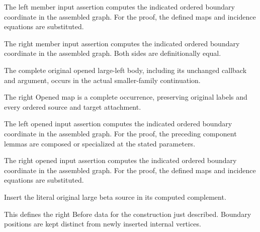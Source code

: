 The left member input assertion computes the indicated ordered boundary coordinate in the assembled graph.
For the proof, the defined maps and incidence equations are substituted.
\par{}

The right member input assertion computes the indicated ordered boundary coordinate in the assembled graph.
Both sides are definitionally equal.
\par{}

The complete original opened large-left body, including its unchanged callback and argument, occurs in the actual smaller-family continuation.
\par{}

The right Opened map is a complete occurrence, preserving original labels and every ordered source and target attachment.
\par{}

The left opened input assertion computes the indicated ordered boundary coordinate in the assembled graph.
For the proof, the preceding component lemmas are composed or specialized at the stated parameters.
\par{}

The right opened input assertion computes the indicated ordered boundary coordinate in the assembled graph.
For the proof, the defined maps and incidence equations are substituted.
\par{}

Insert the literal original large beta source in its computed complement.
\par{}

This defines the right Before data for the construction just described. Boundary positions are kept distinct from newly inserted internal vertices.
\par{}

